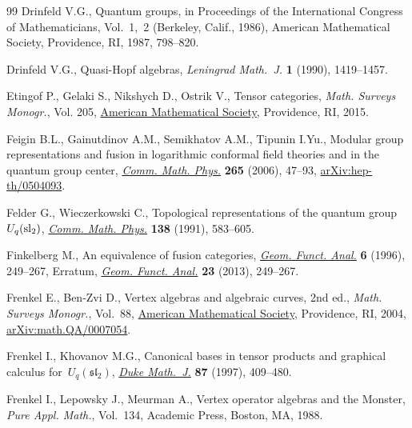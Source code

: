 \begin{thebibliography}{99}
Drinfeld V.G., Quantum groups, in Proceedings of the {I}nternational {C}ongress
 of {M}athematicians, {V}ol.~1,~2 ({B}erkeley, {C}alif., 1986), American
 Mathematical Society, Providence, RI, 1987, 798--820.

Drinfeld V.G., Quasi-{H}opf algebras, \textit{Leningrad Math.~J.} \textbf{1}
 (1990), 1419--1457.

Etingof P., Gelaki S., Nikshych D., Ostrik V., Tensor categories, \textit{Math.
 Surveys Monogr.}, Vol. 205, \href{https://doi.org/10.1090/surv/205}{American
 Mathematical Society}, Providence, RI, 2015.

Feigin B.L., Gainutdinov A.M., Semikhatov A.M., Tipunin I.Yu., Modular group
 representations and fusion in logarithmic conformal field theories and in the
 quantum group center,
 \href{https://doi.org/10.1007/s00220-006-1551-6}{\textit{Comm. Math. Phys.}}
 \textbf{265} (2006), 47--93,
 \href{http://arxiv.org/abs/hep-th/0504093}{arXiv:hep-th/0504093}.

Felder G., Wieczerkowski C., Topological representations of the quantum
 group~{$U_q({\rm sl}_2)$},
 \href{https://doi.org/10.1007/BF02102043}{\textit{Comm. Math. Phys.}}
 \textbf{138} (1991), 583--605.

Finkelberg M., An equivalence of fusion categories,
 \href{https://doi.org/10.1007/BF02247887}{\textit{Geom. Funct. Anal.}}
 \textbf{6} (1996), 249--267, {E}rratum,
 \href{https://doi.org/10.1007/s00039-013-0230-y}{\textit{Geom. Funct. Anal.}}
 \textbf{23} (2013), 249--267.

Frenkel E., Ben-Zvi D., Vertex algebras and algebraic curves, 2nd ed., \textit{Math.
 Surveys Monogr.}, Vol.~88,
 \href{https://doi.org/10.1090/surv/088}{American Mathematical Society},
 Providence, RI, 2004,
 \href{http://arxiv.org/abs/math.QA/0007054}{arXiv:math.QA/0007054}.

Frenkel I., Khovanov M.G., Canonical bases in tensor products and graphical
 calculus for~{$U_q({\mathfrak s}{\mathfrak l}_2)$},
 \href{https://doi.org/10.1215/S0012-7094-97-08715-9}{\textit{Duke Math.~J.}}
 \textbf{87} (1997), 409--480.

Frenkel I., Lepowsky J., Meurman A., Vertex operator algebras and the
 {M}onster, \textit{Pure Appl. Math.}, Vol.~134, Academic Press, Boston, MA,
 1988.


\end{thebibliography}

